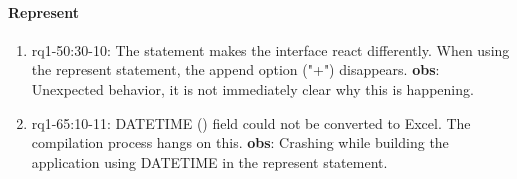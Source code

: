 \paragraph{Represent}
\begin{enumerate}
    \item rq1-50:30-10: The  statement makes the interface react differently.
    When using the represent statement, the append option ("+") disappears.
    \newline\textbf{obs}: Unexpected behavior, it is not immediately clear why this is happening.

    \item rq1-65:10-11: DATETIME () field could not be converted to Excel.
    The compilation process hangs on this.
    \newline\textbf{obs}: Crashing while building the application using DATETIME in the represent statement.

\end{enumerate}

